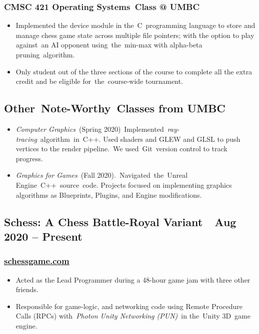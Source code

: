 \documentclass[letterpaper]{article}
\newcommand\textstyleHeadingivChar[1]{\textit{\textcolor[rgb]{0.6784314,0.30980393,0.05882353}{#1}}}
\newcommand\textstyleToolPrimaryChar[1]{\textcolor[rgb]{0.18039216,0.45490196,0.70980394}{#1}}
\newcommand\textstyleHyperlink[1]{\textcolor[rgb]{0.019607844,0.3882353,0.75686276}{#1}}
\newcommand\textstyleHeadingiiiChar[1]{\textit{#1}}
\newcommand\liststyleLFOi{%
\renewcommand\labelitemi{{}-}
\renewcommand\labelitemii{o}
\renewcommand\labelitemiii{${\blacksquare}$}
\renewcommand\labelitemiv{{\textbullet}}
}
\begin{document}
\subsubsection[CMSC 421 Operating Systems\ Class @ UMBC]{CMSC 421 Operating Systems\ Class @ UMBC}
\liststyleLFOi
\begin{itemize}
\item Implemented the device module in the\ \textstyleToolPrimaryChar{C}\ programming language to store and manage chess
game state across multiple file pointers; with the option to play against\ an AI opponent using\ the\ min-max with
alpha-beta pruning\ algorithm.
\item Only student out of the three sections of the course to complete all the extra credit and be eligible
for\ the\ course-wide tournament.
\end{itemize}
\subsection[Other\ Note{}-Worthy\ Classes from UMBC]{Other\ Note-Worthy\ Classes from UMBC}
\liststyleLFOi
\begin{itemize}
\item \textstyleHeadingiiiChar{Computer Graphics}\ (Spring
2020)\ Implemented\ \textstyleHeadingivChar{ray-tracing}\textcolor[rgb]{0.76862746,0.34901962,0.06666667}{\ }algorithm\ in\ \textstyleToolPrimaryChar{C++}.
Used shaders and GLEW and GLSL to push vertices to the render pipeline.\ We
used\ \textstyleToolPrimaryChar{Git}\ version control to track progress.
\item \textstyleHeadingiiiChar{Graphics for Games}\ (Fall 2020).\ Navigated\ the\ \textstyleToolPrimaryChar{Unreal
Engine}\ \textstyleToolPrimaryChar{C++}\ source\ code. Projects focused on implementing graphics algorithms as
Blueprints, Plugins, and Engine modifications.
\end{itemize}
\subsection[Schess: A Chess Battle{}-Royal Variant\ \ Aug 2020 {}-- Present]{Schess: A Chess Battle-Royal Variant\ \ Aug
2020 -- Present}
\subsubsection[schessgame.com]{\href{http://www.schessgame.com/}{\textstyleHyperlink{schessgame.com}}}
\liststyleLFOi
\begin{itemize}
\item Acted as the Lead Programmer during a 48-hour game jam with three other friends.
\item Responsible for game-logic, and networking code using Remote Procedure Calls (RPCs)
with\ \textstyleHeadingivChar{Photon Unity Networking (PUN)}\ in the\ \textstyleToolPrimaryChar{Unity 3D}\ game engine.
\end{itemize}
\end{document}
